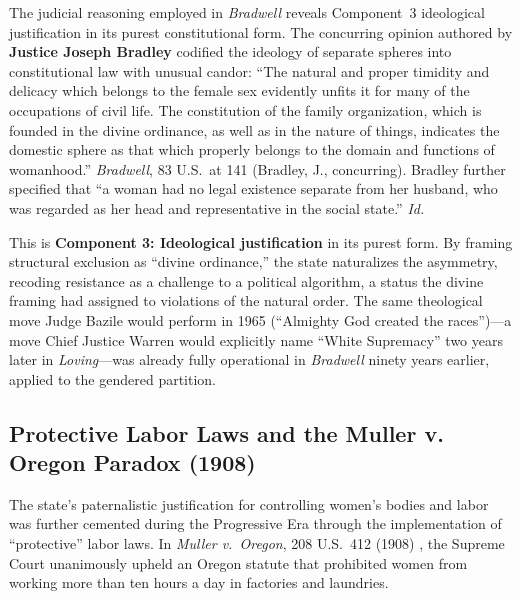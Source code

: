 The judicial reasoning employed in \textit{Bradwell} reveals Component~3 ideological justification in its purest constitutional form. The concurring opinion authored by \textbf{Justice Joseph Bradley} codified the ideology of separate spheres into constitutional law with unusual candor: ``The natural and proper timidity and delicacy which belongs to the female sex evidently unfits it for many of the occupations of civil life. The constitution of the family organization, which is founded in the divine ordinance, as well as in the nature of things, indicates the domestic sphere as that which properly belongs to the domain and functions of womanhood.'' \textit{Bradwell}, 83 U.S.\ at 141 (Bradley, J., concurring). Bradley further specified that ``a woman had no legal existence separate from her husband, who was regarded as her head and representative in the social state.'' \textit{Id.}

This is \textbf{Component 3: Ideological justification} in its purest form. By framing structural exclusion as ``divine ordinance,'' the state naturalizes the asymmetry, recoding resistance as a challenge to a political algorithm, a status the divine framing had assigned to violations of the natural order. The same theological move Judge Bazile would perform in 1965 (``Almighty God created the races'')---a move Chief Justice Warren would explicitly name ``White Supremacy'' two years later in \textit{Loving}---was already fully operational in \textit{Bradwell} ninety years earlier, applied to the gendered partition.

\subsection{Protective Labor Laws and the Muller v. Oregon Paradox (1908)}

The state’s paternalistic justification for controlling women’s bodies and labor was further cemented during the Progressive Era through the implementation of ``protective'' labor laws. In \textit{Muller v.\ Oregon}, 208 U.S.\ 412 (1908) \cite{muller}, the Supreme Court unanimously upheld an Oregon statute that prohibited women from working more than ten hours a day in factories and laundries.

